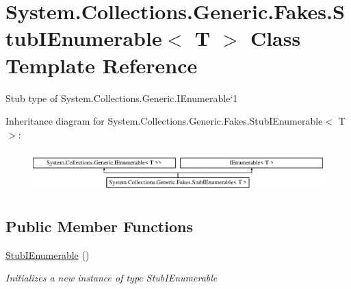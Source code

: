 \hypertarget{class_system_1_1_collections_1_1_generic_1_1_fakes_1_1_stub_i_enumerable_3_01_t_01_4}{\section{System.\-Collections.\-Generic.\-Fakes.\-Stub\-I\-Enumerable$<$ T $>$ Class Template Reference}
\label{class_system_1_1_collections_1_1_generic_1_1_fakes_1_1_stub_i_enumerable_3_01_t_01_4}
}


Stub type of System.\-Collections.\-Generic.\-I\-Enumerable`1 


Inheritance diagram for System.\-Collections.\-Generic.\-Fakes.\-Stub\-I\-Enumerable$<$ T $>$\-:\begin{figure}[H]
\begin{center}
\leavevmode
\includegraphics[height=1.632653cm]{class_system_1_1_collections_1_1_generic_1_1_fakes_1_1_stub_i_enumerable_3_01_t_01_4}
\end{center}
\end{figure}
\subsection*{Public Member Functions}
\begin{DoxyCompactItemize}
\item 
\hyperlink{class_system_1_1_collections_1_1_generic_1_1_fakes_1_1_stub_i_enumerable_3_01_t_01_4_a84f48465a6a792267b0c70285138e98d}{Stub\-I\-Enumerable} ()
\begin{DoxyCompactList}\small\item\em Initializes a new instance of type Stub\-I\-Enumerable\end{DoxyCompactList}\end{DoxyCompactItemize}

